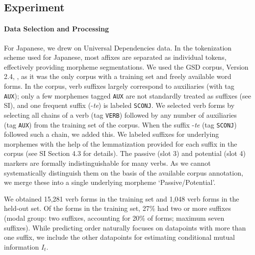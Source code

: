 

\subsection{Experiment}
\paragraph{Data Selection and Processing}
For Japanese, we drew on Universal Dependencies data.
In the tokenization scheme used for Japanese, most affixes are separated as individual tokens, effectively providing morpheme segmentations.
We used the GSD corpus, Version 2.4, \citep{tanaka2016universal, asahara2018universal}, as it was the only corpus with a training set and freely available word forms.
In the corpus, verb suffixes largely correspond to auxiliaries (with tag \texttt{AUX}); only a few morphemes tagged \texttt{AUX} are not standardly treated as suffixes (see SI), and one frequent suffix (-\textit{te}) is labeled \texttt{SCONJ}.
We selected verb forms by selecting all chains of a verb (tag \texttt{VERB}) followed by any number of auxiliaries (tag \texttt{AUX}) from the training set of the corpus. When the suffix -\textit{te} (tag \texttt{SCONJ}) followed such a chain, we added this.
We labeled suffixes for underlying morphemes with the help of the lemmatization provided for each suffix in the corpus (see SI Section 4.3 for details).
The passive (slot 3) and potential (slot 4) markers are formally indistinguishable for many verbs.
As we cannot systematically distinguish them on the basis of the available corpus annotation, we merge these into a single underlying morpheme `Passive/Potential'.

We obtained 15,281 verb forms in the training set and 1,048 verb forms in the held-out set.
Of the forms in the training set, 27\% had two or more suffixes (modal group: two suffixes, accounting for 20\% of forms; maximum seven suffixes).
While predicting order naturally focuses on datapoints with more than one suffix, we include the other datapoints for estimating conditional mutual information $I_t$.


